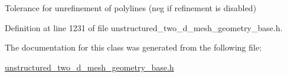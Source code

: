 Tolerance for unrefinement of polylines (neg if refinement is disabled) 



Definition at line 1231 of file unstructured\+\_\+two\+\_\+d\+\_\+mesh\+\_\+geometry\+\_\+base.\+h.



The documentation for this class was generated from the following file\+:\begin{DoxyCompactItemize}
\item 
\hyperlink{unstructured__two__d__mesh__geometry__base_8h}{unstructured\+\_\+two\+\_\+d\+\_\+mesh\+\_\+geometry\+\_\+base.\+h}\end{DoxyCompactItemize}
